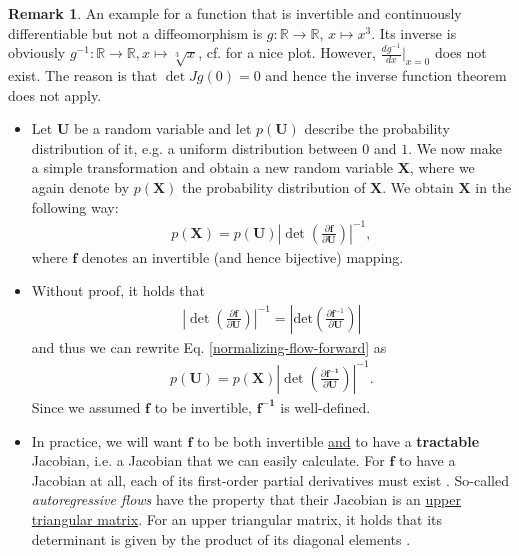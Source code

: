 \documentclass[12pt, a4paper]{article}
\numberwithin{equation}{section}
\theoremstyle{definition}
\theoremstyle{definition}
\newtheorem{remark}[thm]{Remark} %
\begin{document}
	\begin{remark} An example for a function that is invertible and continuously differentiable but not a diffeomorphism is $g: \mathbb{R}\rightarrow\mathbb{R}$, $x\mapsto x^3$. Its inverse is obviously $g^{-1}: \mathbb{R}\rightarrow\mathbb{R}, x\mapsto \sqrt[3]{x}$, cf. \cite{cube-root} for a nice plot. However, $\frac{dg^{-1}}{dx}|_{x = 0}$ does not exist. The reason is that $\det Jg(0) = 0$ and hence the inverse function theorem does not apply. 
	\end{remark}
	\begin{itemize}
		\item Let $\mathbf{U}$ be a random variable and let $p(\mathbf{U})$ describe the probability distribution of it, e.g. a uniform distribution between $0$ and $1$. We now make a simple transformation and obtain a new random variable $\mathbf{X}$, where we again denote by $p(\mathbf{X})$ the probability distribution of $\mathbf{X}$. We obtain $\mathbf{X}$ in the following way: 
		\begin{align}\label{normalizing-flow-forward}
			p(\mathbf{X}) = p(\mathbf{U})\left\vert \det\left(\frac{\partial\mathbf{f}}{\partial \mathbf{U}}\right)\right\vert^{-1}, 
		\end{align}
		where $\mathbf{f}$ denotes an invertible (and hence bijective) mapping. 
		
		\item Without proof, it holds that 
		\begin{align}
			\left\vert \det\left(\frac{\partial\mathbf{f}}{\partial\mathbf{U}}\right)\right\vert^{-1} = \left\vert \text{det}\left(\frac{\partial\mathbf{f}^{-1}}{\partial\mathbf{U}}\right) \right\vert 
		\end{align}
		and thus we can rewrite Eq. \eqref{normalizing-flow-forward} as 
		\begin{align}\label{normalizing-flow-backward}
			p(\mathbf{U}) = p(\mathbf{X})\left\vert \det\left(\frac{\partial\mathbf{f^{-1}}}{\partial \mathbf{U}}\right)\right\vert^{-1}. 
		\end{align}
		Since we assumed $\mathbf{f}$ to be invertible, $\mathbf{f^{-1}}$ is well-defined. 
		
		\item In practice, we will want $\mathbf{f}$ to be both invertible \underline{and} to have a \textbf{tractable} Jacobian, i.e. a Jacobian that we can easily calculate. For $\mathbf{f}$ to have a Jacobian at all, each of its first-order partial derivatives must exist \cite{jacobi-matrix}.
		So-called \textit{autoregressive flows} have the property that their Jacobian is an \underline{upper triangular matrix}. For an upper triangular matrix, it holds that its determinant is given by the product of its diagonal elements \cite{triangular-matrices}.
	\end{itemize}
\end{document}
